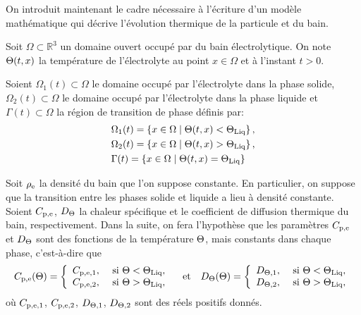 On introduit maintenant le cadre nécessaire à l'écriture d'un modèle
mathématique qui décrive l'évolution thermique de la particule et du
bain.

Soit $\Omega\subset \mathbb R^3$ un domaine ouvert occupé par du bain
électrolytique. On note $\Theta(t, x)$ la température de
l'électrolyte au point $x \in \Omega$ et à l'instant $t > 0$.

Soient $\Omega_1(t)\subset \Omega$ le domaine occupé par l'électrolyte
dans la phase solide, $\Omega_2(t)\subset \Omega$ le domaine occupé
par l'électrolyte dans la phase liquide et $\Gamma(t) \subset \Omega$
la région de transition de phase définis par:
\begin{align}\label{eq:phase-domains}
  &\Omega_1(t) = \cparent{x\in\Omega \mid %
                         \temperature(t, x) < \tliq},\\
  &\Omega_2(t) = \cparent{x\in\Omega \mid \temperature(t, x) %
    > \tliq},\\
  &\Gamma(t) = \cparent{x\in\Omega\mid \temperature(t, x) = \tliq}
\end{align}

Soit $\rho_\mathrm{e}$ la densité du bain que l'on suppose
constante. En particulier, on suppose que la transition entre les
phases solide et liquide a lieu à densité constante.
Soient $C_{\mathrm{p,e}}$, $D_\Theta$ la chaleur
spécifique et le coefficient de diffusion thermique du bain,
respectivement. Dans la suite, on fera l'hypothèse que les paramètres
$C_{\mathrm{p,e}}$ et $D_\Theta$ sont des fonctions de la
température $\Theta$, mais constants dans chaque phase,
c'est-à-dire que
\begin{equation}
  C_{\mathrm{p,e}}(\Theta) = \left\{
  \begin{array}{ll}
    C_{\mathrm{p,e,1}}, & \text{ si } \Theta < \Theta_\text{Liq},\\
    C_{\mathrm{p,e,2}}, & \text{ si } \Theta > \Theta_\text{Liq},
  \end{array}
  \right.
  \quad\text{et}\quad
  D_\Theta(\Theta) = \left\{
  \begin{array}{ll}
    D_{\Theta,\mathrm{1}}, & \text{ si } \Theta < \Theta_\text{Liq},\\
    D_{\Theta,\mathrm{2}}, & \text{ si } \Theta > \Theta_\text{Liq},
  \end{array}
  \right.
\end{equation}
où $C_{\mathrm{p,e,1}}$, $C_{\mathrm{p,e,2}}$, $D_{\Theta,\mathrm{1}}$,
$D_{\Theta,\mathrm{2}}$ sont des réels positifs donnés.

